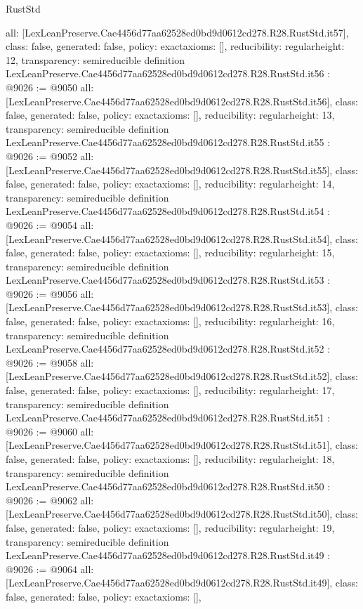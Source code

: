 \begin{lexlean}{RustStd}
\begin{coremodule}
{  all: [LexLeanPreserve.Cae4456d77aa62528ed0bd9d0612cd278.R28.RustStd.it57],
  class: false,
  generated: false,
  policy: exact{axioms: []},
  reducibility: regular{height: 12},
  transparency: semireducible
}
definition LexLeanPreserve.Cae4456d77aa62528ed0bd9d0612cd278.R28.RustStd.it56 : @9026 := @9050 {
  all: [LexLeanPreserve.Cae4456d77aa62528ed0bd9d0612cd278.R28.RustStd.it56],
  class: false,
  generated: false,
  policy: exact{axioms: []},
  reducibility: regular{height: 13},
  transparency: semireducible
}
definition LexLeanPreserve.Cae4456d77aa62528ed0bd9d0612cd278.R28.RustStd.it55 : @9026 := @9052 {
  all: [LexLeanPreserve.Cae4456d77aa62528ed0bd9d0612cd278.R28.RustStd.it55],
  class: false,
  generated: false,
  policy: exact{axioms: []},
  reducibility: regular{height: 14},
  transparency: semireducible
}
definition LexLeanPreserve.Cae4456d77aa62528ed0bd9d0612cd278.R28.RustStd.it54 : @9026 := @9054 {
  all: [LexLeanPreserve.Cae4456d77aa62528ed0bd9d0612cd278.R28.RustStd.it54],
  class: false,
  generated: false,
  policy: exact{axioms: []},
  reducibility: regular{height: 15},
  transparency: semireducible
}
definition LexLeanPreserve.Cae4456d77aa62528ed0bd9d0612cd278.R28.RustStd.it53 : @9026 := @9056 {
  all: [LexLeanPreserve.Cae4456d77aa62528ed0bd9d0612cd278.R28.RustStd.it53],
  class: false,
  generated: false,
  policy: exact{axioms: []},
  reducibility: regular{height: 16},
  transparency: semireducible
}
definition LexLeanPreserve.Cae4456d77aa62528ed0bd9d0612cd278.R28.RustStd.it52 : @9026 := @9058 {
  all: [LexLeanPreserve.Cae4456d77aa62528ed0bd9d0612cd278.R28.RustStd.it52],
  class: false,
  generated: false,
  policy: exact{axioms: []},
  reducibility: regular{height: 17},
  transparency: semireducible
}
definition LexLeanPreserve.Cae4456d77aa62528ed0bd9d0612cd278.R28.RustStd.it51 : @9026 := @9060 {
  all: [LexLeanPreserve.Cae4456d77aa62528ed0bd9d0612cd278.R28.RustStd.it51],
  class: false,
  generated: false,
  policy: exact{axioms: []},
  reducibility: regular{height: 18},
  transparency: semireducible
}
definition LexLeanPreserve.Cae4456d77aa62528ed0bd9d0612cd278.R28.RustStd.it50 : @9026 := @9062 {
  all: [LexLeanPreserve.Cae4456d77aa62528ed0bd9d0612cd278.R28.RustStd.it50],
  class: false,
  generated: false,
  policy: exact{axioms: []},
  reducibility: regular{height: 19},
  transparency: semireducible
}
definition LexLeanPreserve.Cae4456d77aa62528ed0bd9d0612cd278.R28.RustStd.it49 : @9026 := @9064 {
  all: [LexLeanPreserve.Cae4456d77aa62528ed0bd9d0612cd278.R28.RustStd.it49],
  class: false,
  generated: false,
  policy: exact{axioms: []},
}
\end{coremodule}
\end{lexlean}
